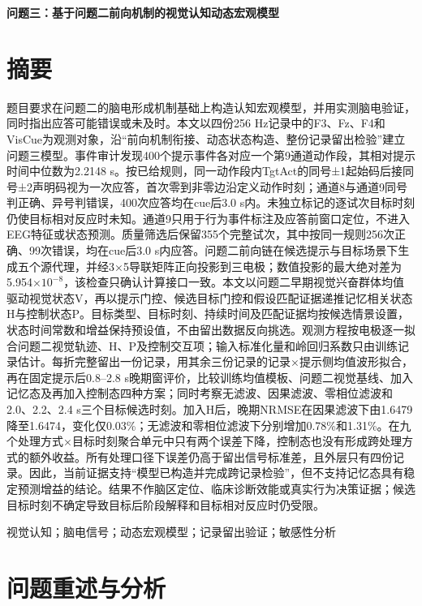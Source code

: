 \documentclass[12pt,a4paper]{article}
\begin{document}
\thispagestyle{plain}
\begin{center}
  {\fontsize{16pt}{24pt}\selectfont\bfseries\heitifont 问题三：基于问题二前向机制的视觉认知动态宏观模型\par}
\end{center}
\section*{摘\quad 要}
题目要求在问题二的脑电形成机制基础上构造认知宏观模型，并用实测脑电验证，同时指出应答可能错误或未及时。本文以四份256 Hz记录中的F3、Fz、F4和VisCue为观测对象，沿“前向机制衔接、动态状态构造、整份记录留出检验”建立问题三模型。事件审计发现400个提示事件各对应一个第9通道动作段，其相对提示时间中位数为2.2148 s。按已给规则，同一动作段内TgtAct的同号±1起始码后接同号±2声明码视为一次应答，首次零到非零边沿定义动作时刻；通道8与通道9同号判正确、异号判错误，400次应答均在cue后3.0 s内。未独立标记的逐试次目标时刻仍使目标相对反应时未知。通道9只用于行为事件标注及应答前窗口定位，不进入EEG特征或状态预测。质量筛选后保留355个完整试次，其中按同一规则256次正确、99次错误，均在cue后3.0 s内应答。问题二前向链在候选提示与目标场景下生成五个源代理，并经3×5导联矩阵正向投影到三电极；数值投影的最大绝对差为5.954$\times 10^{-8}$，该检查只确认计算接口一致。本文以问题二早期视觉兴奋群体均值驱动视觉状态V，再以提示门控、候选目标门控和假设匹配证据递推记忆相关状态H与控制状态P。目标类型、目标时刻、持续时间及匹配证据均按候选情景设置，状态时间常数和增益保持预设值，不由留出数据反向挑选。观测方程按电极逐一拟合问题二视觉轨迹、H、P及控制交互项；输入标准化量和岭回归系数只由训练记录估计。每折完整留出一份记录，用其余三份记录的记录×提示侧均值波形拟合，再在固定提示后0.8–2.8 s晚期窗评价，比较训练均值模板、问题二视觉基线、加入记忆态及再加入控制态四种方案；同时考察无滤波、因果滤波、零相位滤波和2.0、2.2、2.4 s三个目标候选时刻。加入H后，晚期NRMSE在因果滤波下由1.6479降至1.6474，变化仅0.03\%；无滤波和零相位滤波下分别增加0.78\%和1.31\%。在九个处理方式×目标时刻聚合单元中只有两个误差下降，控制态也没有形成跨处理方式的额外收益。所有处理口径下误差仍高于留出信号标准差，且外层只有四份记录。因此，当前证据支持“模型已构造并完成跨记录检验”，但不支持记忆态具有稳定预测增益的结论。结果不作脑区定位、临床诊断效能或真实行为决策证据；候选目标时刻不确定导致目标后阶段解释和目标相对反应时仍受限。

视觉认知；脑电信号；动态宏观模型；记录留出验证；敏感性分析

\newpage
\tableofcontents
\newpage
{}\setcounter{page}{1}

\hypertarget{ux95eeux9898ux91cdux8ff0ux4e0eux5206ux6790}{%
\section{问题重述与分析}\label{ux95eeux9898ux91cdux8ff0ux4e0eux5206ux6790}}
\end{document}

